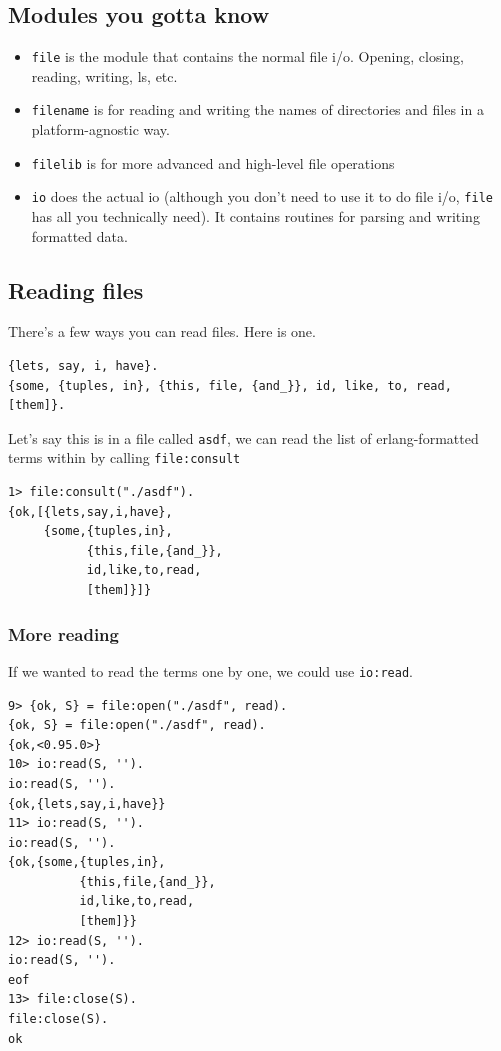 \documentclass[11pt]{article}
\begin{document}
\subsection{Modules you gotta know}
\label{sec:org82ea617}
\begin{itemize}
\item \texttt{file} is the module that contains the normal file i/o. Opening,
closing, reading, writing, ls, etc.
\item \texttt{filename} is for reading and writing the names of directories
and files in a platform-agnostic way.
\item \texttt{filelib} is for more advanced and high-level file operations
\item \texttt{io} does the actual io (although you don't need to use it to do
file i/o, \texttt{file} has all you technically need). It contains
routines for parsing and writing formatted data.
\end{itemize}

\subsection{Reading files}
\label{sec:org54f5c86}
There's a few ways you can read files. Here is one.
\begin{verbatim}
{lets, say, i, have}.
{some, {tuples, in}, {this, file, {and_}}, id, like, to, read, [them]}.
\end{verbatim}
Let's say this is in a file called \texttt{asdf}, we can read the list of
erlang-formatted terms within by calling \texttt{file:consult}
\begin{verbatim}
1> file:consult("./asdf").
{ok,[{lets,say,i,have},
     {some,{tuples,in},
           {this,file,{and_}},
           id,like,to,read,
           [them]}]}
\end{verbatim}

\subsubsection{More reading}
\label{sec:org8b901da}
If we wanted to read the terms one by one, we could use \texttt{io:read}. 

\begin{verbatim}
9> {ok, S} = file:open("./asdf", read).
{ok, S} = file:open("./asdf", read).
{ok,<0.95.0>}
10> io:read(S, '').
io:read(S, '').
{ok,{lets,say,i,have}}
11> io:read(S, '').
io:read(S, '').
{ok,{some,{tuples,in},
          {this,file,{and_}},
          id,like,to,read,
          [them]}}
12> io:read(S, '').
io:read(S, '').
eof
13> file:close(S).
file:close(S).
ok
\end{verbatim}
\end{document}
